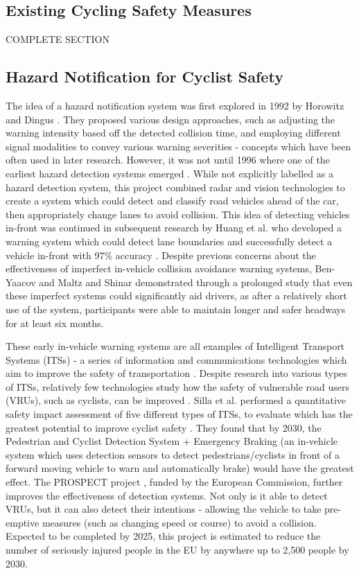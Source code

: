 \documentclass{interim}
\begin{document}
\subsection{Existing Cycling Safety Measures}
COMPLETE SECTION

\subsection{Hazard Notification for Cyclist Safety}
The idea of a hazard notification system was first explored in 1992 by Horowitz and Dingus \cite{doi:10.1177/154193129203601320}. They proposed various design approaches, such as adjusting the warning intensity based off the detected collision time, and employing different signal modalities to convey various warning severities - concepts which have been often used in later research. However, it was not until 1996 where one of the earliest hazard detection systems emerged \cite{566402}. While not explicitly labelled as a hazard detection system, this project combined radar and vision technologies to create a system which could detect and classify road vehicles ahead of the car, then appropriately change lanes to avoid collision. This idea of detecting vehicles in-front was continued in subsequent research by Huang et al. who developed a warning system which could detect lane boundaries and successfully detect a vehicle in-front with 97\% accuracy \cite{1307429}. Despite previous concerns about the effectiveness of imperfect in-vehicle collision avoidance warning systems, Ben-Yaacov \cite{doi:10.1518/0018720024497925} and Maltz and Shinar \cite{doi:10.1518/hfes.46.2.357.37348} demonstrated through a prolonged study that even these imperfect systems could significantly aid drivers, as after a relatively short use of the system, participants were able to maintain longer and safer headways for at least six months.

These early in-vehicle warning systems are all examples of Intelligent Transport Systems (ITSs) - a series of information and communications technologies which aim to improve the safety of transportation \cite{its}. Despite research into various types of ITSs, relatively few technologies study how the safety of vulnerable road users (VRUs), such as cyclists, can be improved \cite{Scholliers2017}. Silla et al. performed a quantitative safety impact assessment of five different types of ITSs, to evaluate which has the greatest potential to improve cyclist safety \cite{SILLA2017134}. They found that by 2030, the Pedestrian and Cyclist Detection System + Emergency Braking (an in-vehicle system which uses detection sensors to detect pedestrians/cyclists in front of a forward moving vehicle to warn and automatically brake) would have the greatest effect. The PROSPECT project \cite{cieslik2019improving}, funded by the European Commission, further improves the effectiveness of detection systems. Not only is it able to detect VRUs, but it can also detect their intentions - allowing the vehicle to take pre-emptive measures (such as changing speed or course) to avoid a collision. Expected to be completed by 2025, this project is estimated to reduce the number of seriously injured people in the EU by anywhere up to 2,500 people by 2030.
\end{document}
